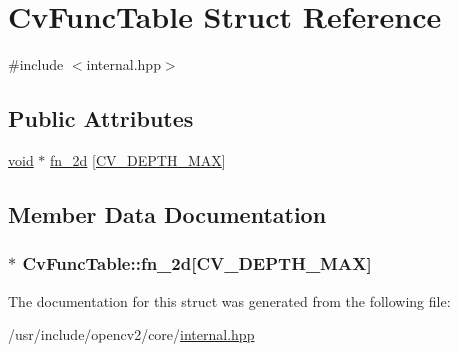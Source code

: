 \hypertarget{structCvFuncTable}{\section{Cv\-Func\-Table Struct Reference}
\label{structCvFuncTable}
}


{\ttfamily \#include $<$internal.\-hpp$>$}

\subsection*{Public Attributes}
\begin{DoxyCompactItemize}
\item 
\hyperlink{legacy_8hpp_a8bb47f092d473522721002c86c13b94e}{void} $\ast$ \hyperlink{structCvFuncTable_af1496669a2aad470bde57a86dd942b97}{fn\-\_\-2d} \mbox{[}\hyperlink{core_2types__c_8h_acba5122a909469622bb5398aac729910}{C\-V\-\_\-\-D\-E\-P\-T\-H\-\_\-\-M\-A\-X}\mbox{]}
\end{DoxyCompactItemize}


\subsection{Member Data Documentation}
\hypertarget{structCvFuncTable_af1496669a2aad470bde57a86dd942b97}{
\subsubsection[{fn\-\_\-2d}]{$\ast$ Cv\-Func\-Table\-::fn\-\_\-2d\mbox{[}{\bf C\-V\-\_\-\-D\-E\-P\-T\-H\-\_\-\-M\-A\-X}\mbox{]}}}\label{structCvFuncTable_af1496669a2aad470bde57a86dd942b97}


The documentation for this struct was generated from the following file\-:\begin{DoxyCompactItemize}
\item 
/usr/include/opencv2/core/\hyperlink{internal_8hpp}{internal.\-hpp}\end{DoxyCompactItemize}
